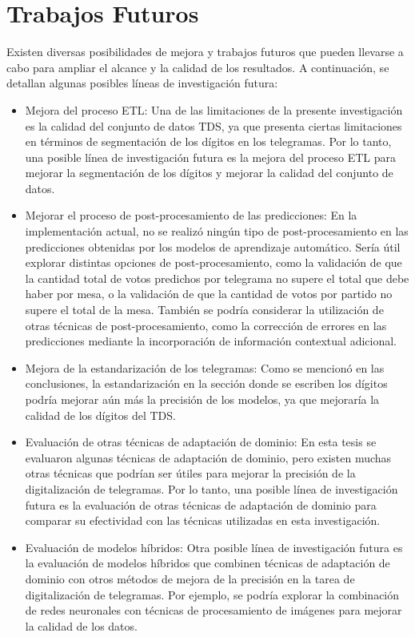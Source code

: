 \section{Trabajos Futuros}

Existen diversas posibilidades de mejora y trabajos futuros que pueden llevarse a cabo para ampliar el alcance y la
calidad de los resultados. A continuación, se detallan algunas posibles líneas de investigación futura:

\begin{itemize}
      \item Mejora del proceso ETL: Una de las limitaciones de la presente investigación es la calidad del conjunto de datos TDS,
            ya que presenta ciertas limitaciones en términos de segmentación de los dígitos en los telegramas. Por lo tanto, una
            posible línea de investigación futura es la mejora del proceso ETL para mejorar la segmentación de los dígitos y
            mejorar la calidad del conjunto de datos.
      \item Mejorar el proceso de post-procesamiento de las predicciones: En la implementación actual, no se realizó ningún tipo de
            post-procesamiento en las predicciones obtenidas por los modelos de aprendizaje automático. Sería útil explorar
            distintas opciones de post-procesamiento, como la validación de que la cantidad total de votos predichos por telegrama
            no supere el total que debe haber por mesa, o la validación de que la cantidad de votos por partido no supere el total
            de la mesa. También se podría considerar la utilización de otras técnicas de post-procesamiento, como la corrección de
            errores en las predicciones mediante la incorporación de información contextual adicional.
      \item Mejora de la estandarización de los telegramas: Como se mencionó en las conclusiones, la estandarización en la sección
            donde se escriben los dígitos podría mejorar aún más la precisión de los modelos, ya que mejoraría la calidad de los
            dígitos del TDS.
      \item Evaluación de otras técnicas de adaptación de dominio: En esta tesis se evaluaron algunas técnicas de adaptación de
            dominio, pero existen muchas otras técnicas que podrían ser útiles para mejorar la precisión de la digitalización de
            telegramas. Por lo tanto, una posible línea de investigación futura es la evaluación de otras técnicas de adaptación de
            dominio para comparar su efectividad con las técnicas utilizadas en esta investigación.
      \item Evaluación de modelos híbridos: Otra posible línea de investigación futura es la evaluación de modelos híbridos que
            combinen técnicas de adaptación de dominio con otros métodos de mejora de la precisión en la tarea de digitalización de
            telegramas. Por ejemplo, se podría explorar la combinación de redes neuronales con técnicas de procesamiento de
            imágenes para mejorar la calidad de los datos.
\end{itemize}

